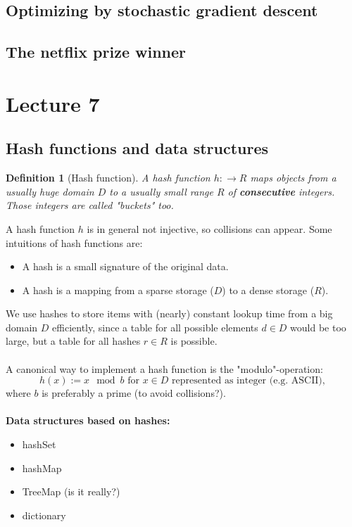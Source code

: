 \documentclass[]{article}
\newtheorem{defi}{Definition}
\begin{document}
\subsection{Optimizing by stochastic gradient descent}

\subsection{The netflix prize winner}


\section{Lecture 7}

\subsection{Hash functions and data structures}
\begin{defi}[Hash function]
A hash function $h: \rightarrow R $ maps objects from a usually huge domain $D$ to a usually small range $R$ of \textbf{consecutive} integers. Those integers are called "buckets" too.
\end{defi}
A hash function $h$ is in general not injective, so collisions can appear. Some intuitions of hash functions are:
\begin{itemize}
\item A hash is a small signature of the original data.
\item A hash is a mapping from a sparse storage ($D$) to a dense storage  ($R$).
\end{itemize}
We use hashes to store items with (nearly) constant lookup time from a big domain $D$ efficiently, since a table for all possible elements $d \in D$ would be too large, but a table for all hashes $r \in R$ is possible.\\ \\

A canonical way to implement a hash function is the "modulo"-operation:
\[
h(x):= x \mod b \text{ for } x \in D \text{ represented as integer (e.g. ASCII)},
\]
where $b$ is preferably a prime (to avoid collisions?).\\ \\

\textbf{Data structures based on hashes:}
\begin{itemize}
\item hashSet
\item hashMap
\item TreeMap (is it really?)
\item dictionary
\end{itemize}
\end{document}
